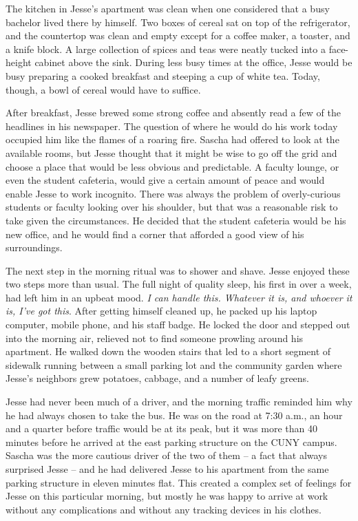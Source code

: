 \documentclass[12pt]{book}
\begin{document}
The kitchen in Jesse's apartment was clean when one considered that a busy bachelor lived there by himself.  Two boxes of cereal sat on top of the refrigerator, and the countertop was clean and empty except for a coffee maker, a toaster, and a knife block.  A large collection of spices and teas were neatly tucked into a face-height cabinet above the sink.  During less busy times at the office, Jesse would be busy preparing a cooked breakfast and steeping a cup of white tea.  Today, though, a bowl of cereal would have to suffice.

After breakfast, Jesse brewed some strong coffee and absently read a few of the headlines in his newspaper.  The question of where he would do his work today occupied him like the flames of a roaring fire.  Sascha had offered to look at the available rooms, but Jesse thought that it might be wise to go off the grid and choose a place that would be less obvious and predictable.  A faculty lounge, or even the student cafeteria, would give a certain amount of peace and would enable Jesse to work incognito.  There was always the problem of overly-curious students or faculty looking over his shoulder, but that was a reasonable risk to take given the circumstances.  He decided that the student cafeteria would be his new office, and he would find a corner that afforded a good view of his surroundings.

The next step in the morning ritual was to shower and shave.  Jesse enjoyed these two steps more than usual.  The full night of quality sleep, his first in over a week, had left him in an upbeat mood.  \emph{I can handle this.  Whatever it is, and whoever it is, I've got this}.  After getting himself cleaned up, he packed up his laptop computer, mobile phone, and his staff badge.  He locked the door and stepped out into the morning air, relieved not to find someone prowling around his apartment.  He walked down the wooden stairs that led to a short segment of sidewalk running between a small parking lot and the community garden where Jesse's neighbors grew potatoes, cabbage, and a number of leafy greens.

Jesse had never been much of a driver, and the morning traffic reminded him why he had always chosen to take the bus.  He was on the road at 7:30 a.m., an hour and a quarter before traffic would be at its peak, but it was more than 40 minutes before he arrived at the east parking structure on the CUNY campus.  Sascha was the more cautious driver of the two of them -- a fact that always surprised Jesse -- and he had delivered Jesse to his apartment from the same parking structure in eleven minutes flat.  This created a complex set of feelings for Jesse on this particular morning, but mostly he was happy to arrive at work without any complications and without any tracking devices in his clothes.
\end{document}
